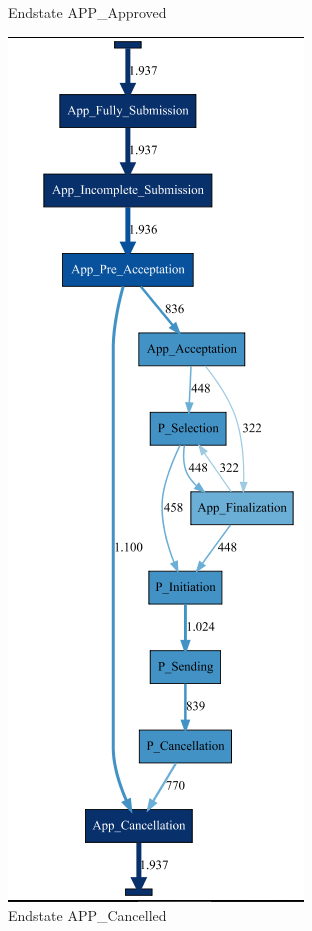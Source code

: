 \begin{figure}[!htbp]
\begin{subfigure}{.3\textwidth}
\caption{Endstate APP\_Approved}
\label{fig:ApprovModel}
\end{subfigure}
\begin{subfigure}{.3\textwidth}
\includegraphics[height=0.3\textheight]{APP_CancDFG0-1.PNG}
\caption{Endstate APP\_Cancelled}
\label{fig:CancModel}
\end{subfigure}
\begin{subfigure}{.3\textwidth}

\end{subfigure}
\end{figure}
